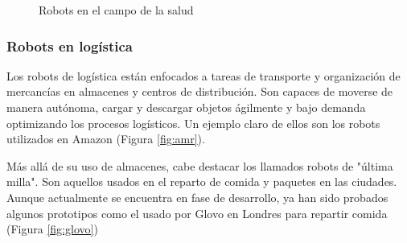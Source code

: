 \begin{figure} [ht!]
  \centering    
  \hspace{0.5cm}
  \hspace{0.5cm}
  \caption{Robots en el campo de la salud}
\end{figure}

\subsubsection{Robots en logística}
Los robots de logística están enfocados a tareas de transporte y organización de mercancías en almacenes y centros de distribución. 
Son capaces de moverse de manera autónoma, cargar y descargar objetos ágilmente y bajo demanda optimizando los procesos logísticos. Un ejemplo 
claro de ellos son los robots utilizados en Amazon (Figura \ref{fig:amr}).

Más allá de su uso de almacenes, cabe destacar los llamados robots de "última milla". Son aquellos usados en el reparto de comida y 
paquetes en las ciudades. Aunque actualmente se encuentra en fase de desarrollo, ya han sido probados algunos 
prototipos como el usado por Glovo en Londres para repartir comida (Figura \ref{fig:glovo})

